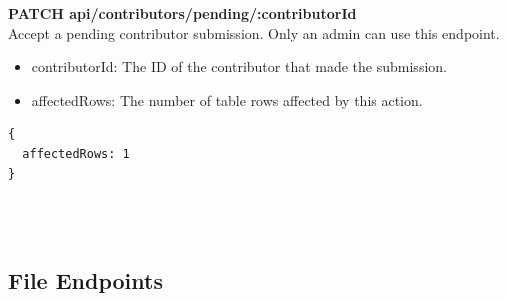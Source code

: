 \documentclass[onecolumn, draftclsnofoot,10pt, compsoc, usenames, dvipsnames]{IEEEtran}
\begin{document}
\noindent
\textbf{\textcolor{BlueGreen}{PATCH} api/contributors/pending/:contributorId} \\
Accept a pending contributor submission. Only an admin can use this endpoint.
\begin{itemize}
  \item contributorId: The ID of the contributor that made the submission.
  \item affectedRows: The number of table rows affected by this action.
\end{itemize}
\begin{lstlisting}[caption=Example Response]
{ 
  affectedRows: 1
}
\end{lstlisting}
\\~\\

\subsection{File Endpoints}
\end{document}
